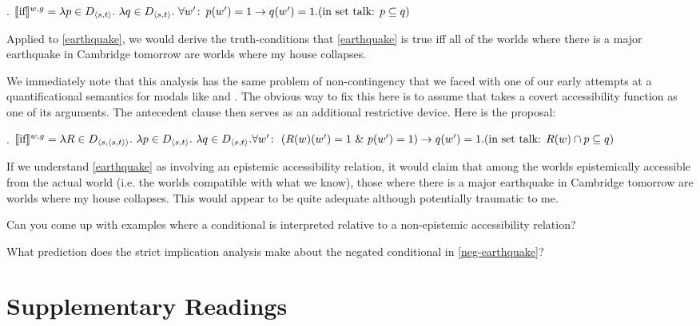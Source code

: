 \ex. $\llbracket \mbox{if} \rrbracket^{w,g} = \lambda p \in D_{\langle s,t \rangle}.\ \lambda q \in D_{\langle s,t \rangle}.\ \forall w'\colon\thinspace p(w')=1 \rightarrow q(w')=1.\\[6pt]
(\mbox{in set talk: } p \subseteq q)$

Applied to \ref{earthquake}, we would derive the truth-conditions that \ref{earthquake} is true iff all of the worlds where there is a major earthquake in Cambridge tomorrow are worlds where my house collapses.

We immediately note that this analysis has the same problem of non-contingency that we faced with one of our early attempts at a quantificational semantics for modals like  and . The obvious way to fix this here is to assume that  takes a covert accessibility function as one of its arguments. The antecedent clause then serves as an additional restrictive device. Here is the proposal:

\ex. $\sv{\mbox{if}}^{w,g} = \lambda R \in D_{\angles{s,\angles{s,t}}}.\ \lambda p\in D_{\angles{s,t}}.\ \lambda q\in D_{\angles{s,t}}.\\
\null\hfill \forall w'\co \left( R(w)(w')=1\ \&\ p(w')=1 \right) \rightarrow q(w')=1.\\[6pt]
(\mbox{in set talk: }R(w)\cap p \subseteq q)$

If we understand \ref{earthquake} as involving an epistemic accessibility relation, it would claim that among the worlds epistemically accessible from the actual world (i.e. the worlds compatible with what we know), those where there is a major earthquake in Cambridge tomorrow are worlds where my house collapses. This would appear to be quite adequate \dash although potentially traumatic to me.

\begin{exercise}
	
	Can you come up with examples where a conditional is interpreted relative to a non-epistemic accessibility relation? \eex
\end{exercise}

\begin{exercise}
	
	What prediction does the strict implication analysis make about the negated conditional in \ref{neg-earthquake}? \eex
\end{exercise}

%
%
\newpage\section*{Supplementary Readings} \label{sec:suppl-read-conditionals}

